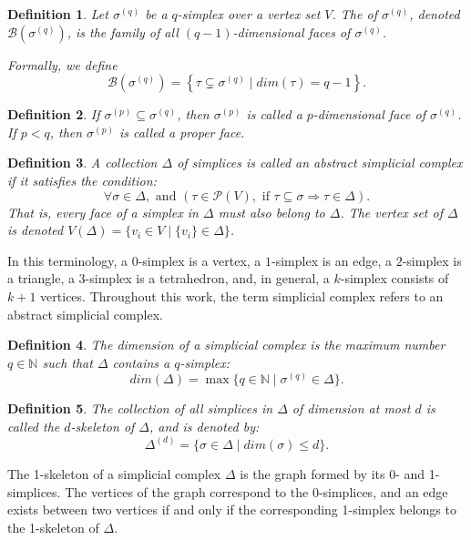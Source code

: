 \documentclass[12pt]{article}
\theoremstyle{normalhead_nobrackets}
\newtheorem{definition}{Definition}[section]
\theoremstyle{exampstyle}
\begin{document}
\begin{definition}
Let $\sigma^{(q)}$ be a $q$-simplex over a vertex set $V$. The  of $\sigma^{(q)}$, denoted $\mathcal{B}(\sigma^{(q)})$, is the family of all $(q-1)$-dimensional faces of $\sigma^{(q)}$.

Formally, we define
\[
\mathcal{B}(\sigma^{(q)}) =
\left\{ \tau \subsetneq \sigma^{(q)} \mid dim(\tau)=q-1 \right\}.
\]
\end{definition}

\begin{definition}
If \( \sigma^{(p)} \subseteq \sigma^{(q)} \), then \( \sigma^{(p)} \) is called a \( p \)-dimensional face of \( \sigma^{(q)} \). If \( p < q \), then $\sigma^{(p)}$ is called a proper face.
\end{definition}

\begin{definition}
A collection \( \Delta \) of simplices is called an abstract simplicial complex if it satisfies the condition:
\[
\forall \sigma \in \Delta,\text{ and } (\tau \in \mathcal{P}(V), \text{ if } \tau \subseteq \sigma \Rightarrow \tau \in \Delta).
\]
That is, every face of a simplex in \( \Delta \) must also belong to \( \Delta \).
The vertex set of $\Delta$ is denoted $V(\Delta) = \{ v_i \in V \mid \{v_i\} \in \Delta \}$.
\end{definition}
In this terminology, a $0$-simplex is a vertex, a $1$-simplex is an edge, a $2$-simplex is a triangle, a $3$-simplex is a tetrahedron, and, in general, a $k$-simplex consists of $k+1$ vertices. Throughout this work, the term simplicial complex refers to an abstract simplicial complex.


\begin{definition}
The dimension of a simplicial complex is the maximum number $q \in \mathbb{N}$ such that $\Delta$ contains a $q$-simplex:
\[
dim(\Delta) = \max\{q \in \mathbb{N} \mid \sigma^{(q)} \in \Delta\}.
\]
\end{definition}
 
\begin{definition}
The collection of all simplices in \( \Delta \) of dimension at most \( d \) is called the \( d \)-skeleton of \( \Delta \), and is denoted by:
\[
\Delta^{(d)} = \{\sigma \in \Delta \mid dim(\sigma) \le d\}.
\]
\end{definition}
The 1-skeleton of a simplicial complex \( \Delta \) is the graph formed by its 0- and 1-simplices. The vertices of the graph correspond to the 0-simplices, and an edge exists between two vertices if and only if the corresponding 1-simplex belongs to the 1-skeleton of \( \Delta \).
\end{document}
